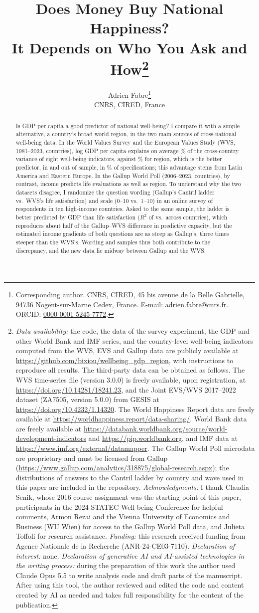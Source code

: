 \documentclass[12pt]{article}
\title{Does Money Buy National Happiness?\\It Depends on Who You Ask and How\thanks{\textit{Data availability:} the code, the data of the survey experiment, the GDP and other World Bank and IMF series, and the country-level well-being indicators computed from the WVS, EVS and Gallup data are publicly available at \href{https://github.com/bixiou/wellbeing_gdp_region}{https://github.com/bixiou/wellbeing\_gdp\_region}, with instructions to reproduce all results. The third-party data can be obtained as follows. The WVS time-series file (version 3.0.0) is freely available, upon registration, at \href{https://doi.org/10.14281/18241.23}{https://doi.org/10.14281/18241.23}, and the Joint EVS/WVS 2017--2022 dataset (ZA7505, version 5.0.0) from GESIS at \href{https://doi.org/10.4232/1.14320}{https://doi.org/10.4232/1.14320}. The World Happiness Report data are freely available at \href{https://worldhappiness.report/data-sharing/}{https://worldhappiness.report/data-sharing/}. World Bank data are freely available at \href{https://databank.worldbank.org/source/world-development-indicators}{https://databank.worldbank.org/source/world-development-indicators} and \href{https://pip.worldbank.org}{https://pip.worldbank.org}, and IMF data at \href{https://www.imf.org/external/datamapper}{https://www.imf.org/external/datamapper}. The Gallup World Poll microdata are proprietary and must be licensed from Gallup (\href{https://www.gallup.com/analytics/318875/global-research.aspx}{https://www.gallup.com/analytics/318875/global-research.aspx}); the distributions of answers to the Cantril ladder by country and wave used in this paper are included in the repository. \textit{Acknowledgments:} I thank Claudia Senik, whose 2016 course assignment was the starting point of this paper, participants in the 2024 STATEC Well-being Conference for helpful comments, Armon Rezai and the Vienna University of Economics and Business (WU Wien) for access to the Gallup World Poll data, and Julieta Toffoli for research assistance. \textit{Funding:} this research received funding from Agence Nationale de la Recherche (ANR-24-CE03-7110). \textit{Declaration of interest:} none. \textit{Declaration of generative AI and AI-assisted technologies in the writing process:} during the preparation of this work the author used Claude Opus 5.5 to write analysis code and draft parts of the manuscript. After using this tool, the author reviewed and edited the code and content created by AI as needed and takes full responsibility for the content of the publication.}}
\author{}
\date{}
\author{Adrien Fabre\thanks{Corresponding author. CNRS, CIRED, 45 bis avenue de la Belle Gabrielle, 94736 Nogent-sur-Marne Cedex, France. E-mail: \href{mailto:adrien.fabre@cnrs.fr}{adrien.fabre@cnrs.fr}. ORCID: \href{https://orcid.org/0000-0001-5245-7772}{0000-0001-5245-7772}.}\\[.5ex] \normalsize CNRS, CIRED, France}
\date{}
\begin{document}
\begingroup %
\singlespacing
\renewcommand{\footnotesize}{\scriptsize}
\maketitle

\begin{abstract}
\noindent Is GDP per capita a good predictor of national well-being? I compare it with a simple alternative, a country's broad world region, in the two main sources of cross-national well-being data. In the World Values Survey and the European Values Study (WVS, 1981--2023, \nWVSCountries countries), log GDP per capita explains on average \meanRtwoIncomePPP\% of the cross-country variance of eight well-being indicators, against \meanRtwoRegion\% for region, which is the better predictor, in and out of sample, in \shareRegionBetterWVS\% of \nSpecsWVS specifications; this advantage stems from Latin America and Eastern Europe. In the Gallup World Poll (2006--2023, \nGallupCountries countries), by contrast, income predicts life evaluations as well as region. To understand why the two datasets disagree, I randomize the question wording (Gallup's Cantril ladder vs.\ WVS's life satisfaction) and scale (0--10 vs.\ 1--10) in an online survey of \nFabre respondents in ten high-income countries. Asked to the same sample, the ladder is better predicted by GDP than life satisfaction ($R^2$ of \RtwoTenFabreLadderPooled vs.\ \RtwoTenFabreSatisfactionPooled across countries), which reproduces about half of the Gallup--WVS difference in predictive capacity, but the estimated income gradients of both questions are as steep as Gallup's, three times steeper than the WVS's. Wording and samples thus both contribute to the discrepancy, and the new data lie midway between Gallup and the WVS.
\end{abstract}
\end{document}
